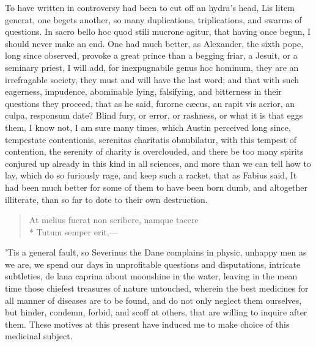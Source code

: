 {To have written in controversy had been to cut off an hydra's head,
Lis litem generat, one begets another, so many duplications,
triplications, and swarms of questions. In sacro bello hoc quod stili
mucrone agitur, that having once begun, I should never make an end. One
had much better, as Alexander, the sixth pope, long since
observed, provoke a great prince than a begging friar, a Jesuit, or a
seminary priest, I will add, for inexpugnabile genus hoc hominum, they
are an irrefragable society, they must and will have the last word; and
that with such eagerness, impudence, abominable lying, falsifying, and
bitterness in their questions they proceed, that as he said,
furorne c\ae{}cus, an rapit vis acrior, an culpa, responsum date? Blind
fury, or error, or rashness, or what it is that eggs them, I know not,
I am sure many times, which Austin perceived long since,
tempestate contentionis, serenitas charitatis obnubilatur, with this
tempest of contention, the serenity of charity is overclouded, and
there be too many spirits conjured up already in this kind in all
sciences, and more than we can tell how to lay, which do so furiously
rage, and keep such a racket, that as Fabius said, It had been
much better for some of them to have been born dumb, and altogether
illiterate, than so far to dote to their own destruction.

\begin{verse}
\textlatin{At melius fuerat non scribere, namque tacere}\\*
\textlatin{Tutum semper erit,}---
\end{verse}

'Tis a general fault, so Severinus the Dane complains in physic,
unhappy men as we are, we spend our days in unprofitable questions and
disputations, intricate subtleties, de lana caprina about moonshine in
the water, leaving in the mean time those chiefest treasures of nature
untouched, wherein the best medicines for all manner of diseases are to
be found, and do not only neglect them ourselves, but hinder, condemn,
forbid, and scoff at others, that are willing to inquire after them.
These motives at this present have induced me to make choice of this
medicinal subject.

}
